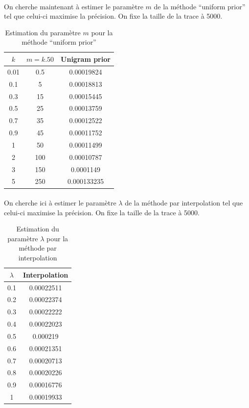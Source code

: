 \documentclass[a4paper,titlepage]{report}
\begin{document}
\paragraph{}

On cherche maintenant à estimer le paramètre $m$ de la méthode ``uniform prior'' tel que celui-ci maximise la précision. On fixe la taille de la trace à 5000.
\begin{table}[h]
	\center
	\begin{tabular}{c|c|c}
		$k$ & $m = k . 50$ & Unigram prior\\
		\hline
		0.01 & 0.5 & \num{0.00019824}\\
		0.1 & 5 & \num{0.00018813}\\
		0.3 & 15 & \num{0.00015445}\\
		0.5 & 25 & \num{0.00013759}\\
		0.7 & 35 & \num{0.00012522}\\
		0.9 & 45 & \num{0.00011752}\\
		1 & 50 & \num{0.00011499}\\
		2 & 100 & \num{0.00010787}\\
		3 & 150 & \num{0.0001149}\\
		5 & 250 & \num{0.000133235}
	\end{tabular}
	\caption{Estimation du paramètre $m$ pour la méthode ``uniform prior''}
\end{table}

\paragraph{}

On cherche ici à estimer le paramètre $\lambda$ de la méthode par interpolation tel que celui-ci maximise la précision. On fixe la taille de la trace à 5000.
\begin{table}[h]
	\center
	\begin{tabular}{c|c}
		$\lambda$ & Interpolation\\
		\hline
		0.1 & \num{0.00022511}\\
		0.2 & \num{0.00022374}\\
		0.3 & \num{0.00022222}\\
		0.4 & \num{0.00022023}\\
		0.5 & \num{0.000219}\\
		0.6 & \num{0.00021351}\\
		0.7 & \num{0.00020713}\\
		0.8 & \num{0.00020226}\\
		0.9 & \num{0.00016776}\\
		1 & \num{0.00019933}
	\end{tabular}
	\caption{Estimation du paramètre $\lambda$ pour la méthode par interpolation}
\end{table}
\end{document}
